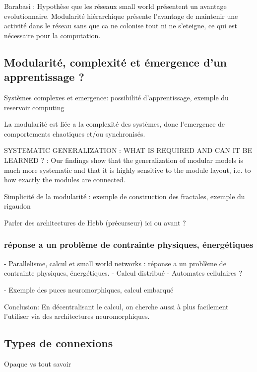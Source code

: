 Barabasi : Hypothèse que les réseaux small world présentent un avantage evolutionnaire.
Modularité hiérarchique présente l'avantage de maintenir une activité dans le réseau sans que ca ne colonise tout ni ne s'eteigne, ce qui est nécessaire pour la computation. 

\subsection{Modularité, complexité et émergence d'un apprentissage ? }

Systèmes complexes et emergence: possibilité d'apprentissage, exemple du reservoir computing

La modularité est liée a la complexité des systèmes, donc l'emergence de comportements chaotiques et/ou synchronisés. 

SYSTEMATIC GENERALIZATION : WHAT IS REQUIRED
AND CAN IT BE LEARNED ? : 
Our findings show that the generalization of modular models is much more systematic and that it is highly sensitive to the module layout, i.e. to how exactly the modules are connected.

Simplicité de la modularité : exemple de construction des fractales, exemple du rigaudon

Parler des architectures de Hebb (précurseur) ici ou avant ?

\subsubsection{réponse a un problème de contrainte physiques, énergétiques}

- Parallelisme, calcul et small world networks : réponse a un problème de contrainte physiques, énergétiques. 
- Calcul distribué 
- Automates cellulaires  ?

- Exemple des puces neuromorphiques, calcul embarqué


Conclusion: En décentralisant le calcul, on cherche aussi à plus facilement l'utiliser via des architectures neuromorphiques. 


\subsection{Types de connexions}

Opaque vs tout savoir

 

